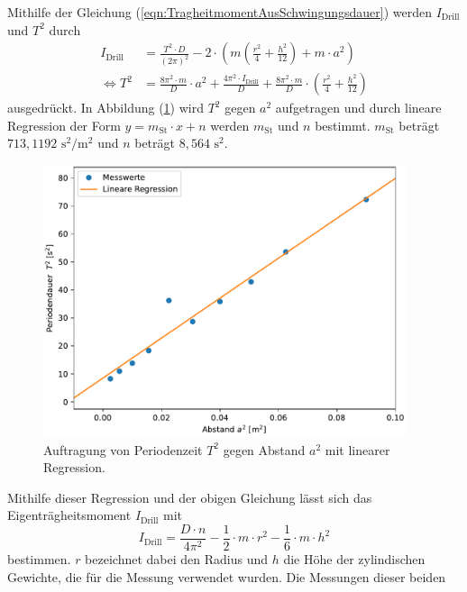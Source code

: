   Mithilfe der Gleichung (\ref{eqn:TragheitmomentAusSchwingungsdauer})
  werden $I_{\text{Drill}}$ und $T^2$ durch
  \begin{align}
    I_{\text{Drill}} &= \frac{T^{2} \cdot D}{\left(2 \pi\right)^{2}} - 2 \cdot \left(m \left(\frac{r^{2}}{4} + \frac{h^{2}}{12} \right) + m \cdot a^2 \right) \\
    \Leftrightarrow T^2 &= \frac{8 \pi^2 \cdot m}{D} \cdot a^2 + \frac{4 \pi^2 \cdot I_{\text{Drill}}}{D} + \frac{8\pi^2 \cdot m}{D} \cdot \left( \frac{r^2}{4} + \frac{h^2}{12} \right)
  \end{align}
  ausgedrückt.
  In Abbildung (\ref{fig:plot}) wird $T^2$ gegen $a^2$ aufgetragen und durch lineare Regression der Form $y = m_{\text{St}} \cdot x + n$ werden $m_{\text{St}}$ und $n$ bestimmt.
  $m_{\text{St}}$ beträgt $713,1192 \,\, \unit{\second\squared\per\meter\squared}$ und $n$ beträgt $8,564\,\, \unit{\second\squared}$. 
  \begin{figure}[H]
    \centering
    \includegraphics[width=0.95\textwidth]{plot.pdf}
    \caption{Auftragung von Periodenzeit $T^2$ gegen Abstand $a^2$ mit linearer Regression.}
    \label{fig:plot}
  \end{figure}
  Mithilfe dieser Regression und der obigen Gleichung lässt sich das Eigenträgheitsmoment $I_{\text{Drill}}$ mit
  \begin{equation}
    I_{\text{Drill}} = \frac{D \cdot n}{4 \pi^2} - \frac{1}{2} \cdot m \cdot r^2 - \frac{1}{6} \cdot m \cdot h^2
  \end{equation}
  bestimmen. $r$ bezeichnet dabei den Radius und $h$ die Höhe der zylindischen Gewichte, die für die Messung verwendet wurden. Die Messungen dieser beiden
